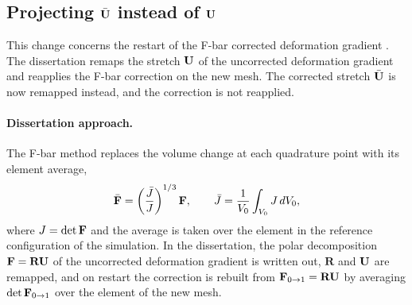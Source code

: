 \FloatBarrier{}

\subsection{Projecting $\bar{\mathbf{U}}$ instead of $\mathbf{U}$}\label{ss:ubar}

This change concerns the restart of the F-bar corrected deformation gradient . The dissertation remaps the stretch $\mathbf{U}$ of the uncorrected deformation gradient and reapplies the F-bar correction on the new mesh. The corrected stretch $\bar{\mathbf{U}}$ is now remapped instead, and the correction is not reapplied.

\paragraph{Dissertation approach.}
The F-bar method replaces the volume change at each quadrature point with its element average,
\begin{equation}
    \bar{\mathbf{F}} = \left(\frac{\bar{J}}{J}\right)^{1/3}\mathbf{F},\qquad \bar{J} = \frac{1}{V_0}\int_{V_0} J\,dV_0,
\end{equation}
where $J=\det\mathbf{F}$ and the average is taken over the element in the reference configuration of the simulation. In the dissertation, the polar decomposition $\mathbf{F}=\mathbf{R}\mathbf{U}$ of the uncorrected deformation gradient is written out, $\mathbf{R}$ and $\mathbf{U}$ are remapped, and on restart the correction is rebuilt from $\mathbf{F}_{0\rightarrow1}=\mathbf{R}\mathbf{U}$ by averaging $\det\mathbf{F}_{0\rightarrow1}$ over the element of the new mesh.
%
%
